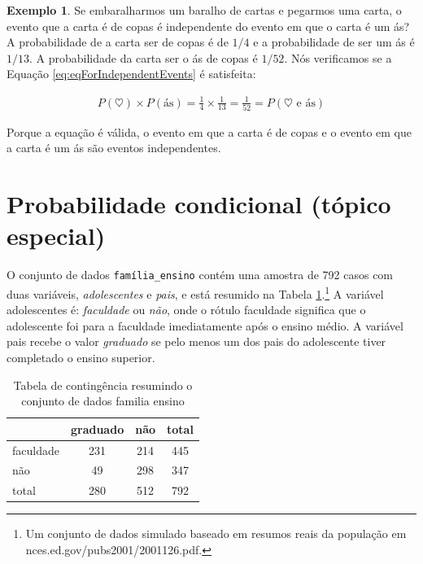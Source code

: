 \documentclass[
]{book}
\theoremstyle{definition}
\theoremstyle{definition}
\newtheorem{example}{Exemplo}[chapter]
\theoremstyle{definition}
\theoremstyle{definition}
\theoremstyle{remark}
\begin{document}
\begin{example}
\protect\hypertarget{exm:unnamed-chunk-56}{}{\label{exm:unnamed-chunk-56} }Se embaralharmos um baralho de cartas e pegarmos uma carta, o evento que a carta é de copas é independente do evento em que o carta é um ás? A probabilidade de a carta ser de copas é de \(1/4\) e a probabilidade de ser um ás é \(1/13\). A probabilidade da carta ser o ás de copas é \(1/52\). Nós verificamos se a Equação \eqref{eq:eqForIndependentEvents} é satisfeita:
\end{example}

\begin{align*}
P({\heartsuit})\times P(\text{ás}) = \frac{1}{4}\times \frac{1}{13} = \frac{1}{52} 
                    = P({\heartsuit}\text{ e ás})
\end{align*}

Porque a equação é válida, o evento em que a carta é de copas e o evento em que a carta é um ás são eventos independentes.

\hypertarget{conditionalProbabilitySection}{%
\section{Probabilidade condicional (tópico especial)}\label{conditionalProbabilitySection}}

O conjunto de dados \texttt{família\_ensino} contém uma amostra de 792 casos com duas variáveis, \emph{adolescentes} e \emph{pais}, e está resumido na Tabela \ref{tab:contTableOfParStCollege}.\footnote{Um conjunto de dados simulado baseado em resumos reais da população em nces.ed.gov/pubs2001/2001126.pdf.} A variável adolescentes é: \emph{faculdade} ou \emph{não}, onde o rótulo faculdade significa que o adolescente foi para a faculdade imediatamente após o ensino médio. A variável pais recebe o valor \emph{graduado} se pelo menos um dos pais do adolescente tiver completado o ensino superior.

\begin{table}

\caption{\label{tab:contTableOfParStCollege}Tabela de contingência resumindo o conjunto de dados familia ensino}
\centering
\begin{tabular}[t]{l|c|c|c}
\hline
  & graduado & não & total\\
\hline
faculdade & 231 & 214 & 445\\
\hline
não & 49 & 298 & 347\\
\hline
total & 280 & 512 & 792\\
\hline
\end{tabular}
\end{table}
\end{document}
